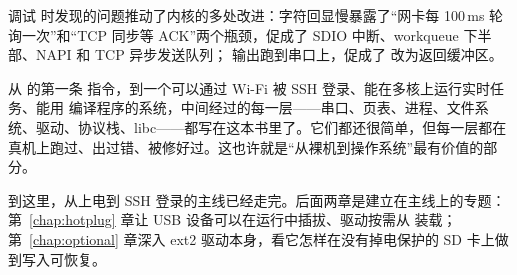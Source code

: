 调试  时发现的问题推动了内核的多处改进：字符回显慢暴露了“网卡每 100\,ms 轮询一次”和“TCP  同步等 ACK”两个瓶颈，促成了 SDIO 中断、workqueue 下半部、NAPI 和 TCP 异步发送队列； 输出跑到串口上，促成了  改为返回缓冲区。

\begin{remark}
  从  的第一条  指令，到一个可以通过 Wi-Fi 被 SSH 登录、能在多核上运行实时任务、能用  编译程序的系统，中间经过的每一层——串口、页表、进程、文件系统、驱动、协议栈、libc——都写在这本书里了。它们都还很简单，但每一层都在真机上跑过、出过错、被修好过。这也许就是“从裸机到操作系统”最有价值的部分。
\end{remark}

到这里，从上电到 SSH 登录的主线已经走完。后面两章是建立在主线上的专题：第~\ref{chap:hotplug} 章让 USB 设备可以在运行中插拔、驱动按需从  装载；第~\ref{chap:optional} 章深入 ext2 驱动本身，看它怎样在没有掉电保护的 SD 卡上做到写入可恢复。
